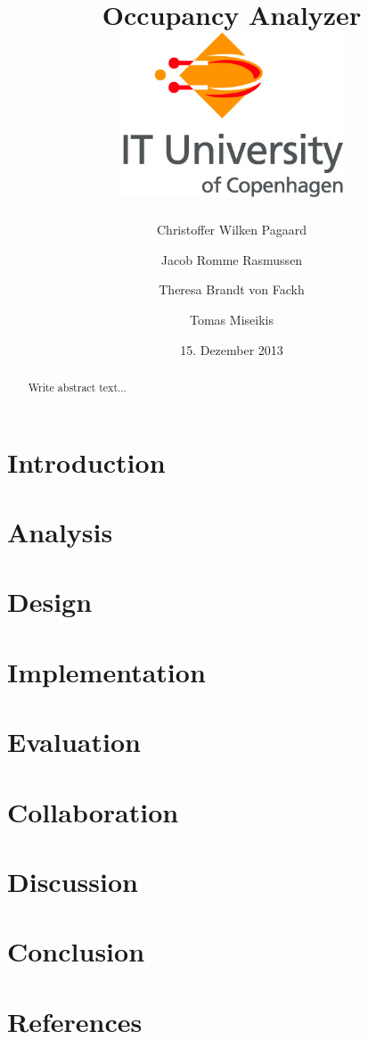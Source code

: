\documentclass[12pt]{report} %
\author{Christoffer Wilken Pagaard
\and
Jacob Romme Rasmussen
\and
Theresa Brandt von Fackh
\and
Tomas Miseikis
}
\title{
		{Occupancy Analyzer}\\
		{\includegraphics[width=0.5\textwidth]{ITU_logo_ENG}}
}
\date{15. Dezember 2013}
\begin{document}


\newpage %

\begin{abstract}
Write abstract text...
\end{abstract}

\newpage

\tableofcontents

\newpage

\chapter{Introduction}


\chapter{Analysis}


\chapter{Design}


\chapter{Implementation}


\chapter{Evaluation}


\chapter{Collaboration}


\chapter{Discussion}


\chapter{Conclusion}


\chapter{References}


%
\end{document}
